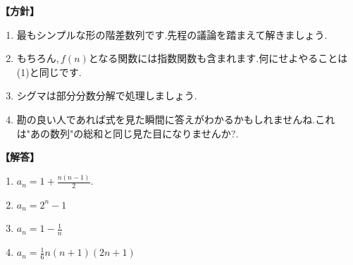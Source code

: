 \documentclass[dvipdfmx,a4paper,11pt,fleqn,openany]{jsbook}
\begin{document}
      \noindent\textbf{【方針】}
      \begin{enumerate}[label=(\arabic*),parsep=3pt]
        \item 最もシンプルな形の階差数列です.先程の議論を踏まえて解きましょう.
        \item もちろん,\,$f(n)$となる関数には指数関数も含まれます.何にせよやることは\,(1)と同じです.
        \item シグマは部分分数分解で処理しましょう.
        \item 勘の良い人であれば式を見た瞬間に答えがわかるかもしれませんね.これは"あの数列"の総和と同じ見た目になりませんか?.
      \end{enumerate}

      \noindent\textbf{【解答】}
      \begin{enumerate}[label=(\arabic*),parsep=3pt]
        \item $\displaystyle a_n=1+\frac{n(n-1)}{2}.$
        \item $\displaystyle a_n=2^n-1$
        \item $\displaystyle a_n=1-\frac{1}{n}$
        \item $\displaystyle a_n=\frac{1}{6}n(n+1)(2n+1)$
      \end{enumerate}
\end{document}
